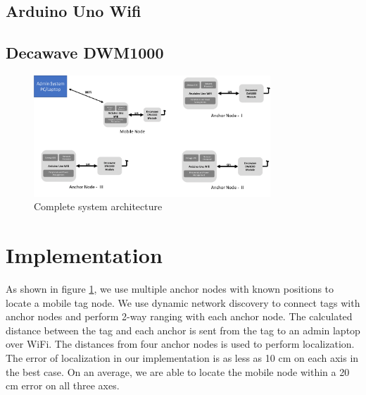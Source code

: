 \documentclass[journal,transmag]{IEEEtran}
\begin{document}
\subsection{Arduino Uno Wifi}
\subsection{Decawave DWM1000}

\begin{figure}[!h]
\centering
\includegraphics[width=3.5in]{sysbd.png}
\caption{{Complete system architecture}}
\label{SYSTEMBD}
\end{figure}


\section{Implementation}
As shown in figure \ref{SYSTEMBD}, we use multiple anchor nodes with known positions to locate a mobile tag node. We use dynamic network discovery to connect tags with anchor nodes and perform 2-way ranging with each anchor node. The calculated distance between the tag and each anchor is sent from the tag to an admin laptop over WiFi. The distances from four anchor nodes is used to perform localization. The error of localization in our implementation is as less as 10 cm on each axis in the best case. On an average, we are able to locate the mobile node within a 20 cm error on all three axes. 
\end{document}
